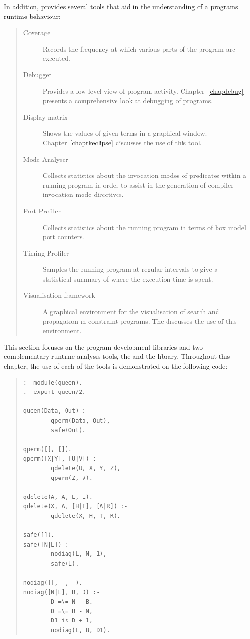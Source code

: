 In addition, \eclipse{} provides several tools that aid in the
understanding of a programs runtime behaviour:

\begin{quote}
\begin{description}
\item[Coverage] Records the frequency at which various parts of the
program are executed.
\item[Debugger] Provides a low level view of program
activity. Chapter~\ref{chapdebug} presents a comprehensive
look at debugging of \eclipse{} programs.
\item[Display matrix] Shows the values of given terms in a graphical
window. Chapter~\ref{chaptkeclipse} discusses the use of this tool.
\item[Mode Analyser] Collects statistics about the invocation modes of
predicates within a running program in order to assist in the generation of
compiler invocation mode directives.
\item[Port Profiler] Collects statistics about the running program in terms
of box model port counters.
\item[Timing Profiler] Samples the running program at regular intervals to
give a statistical summary of where the execution time is spent.
\item[Visualisation framework] A graphical environment for the
visualisation of search and propagation in constraint programs.
The  discusses the use of this
environment.
\end{description}
\end{quote}

This section focuses on the program development libraries and two
complementary runtime analysis tools, the  and the
 library.
Throughout this chapter, the use of each of the tools is demonstrated
on the following  code:
\begin{quote}
\begin{verbatim}
:- module(queen).
:- export queen/2.

queen(Data, Out) :-
        qperm(Data, Out),
        safe(Out).

qperm([], []).
qperm([X|Y], [U|V]) :-
        qdelete(U, X, Y, Z),
        qperm(Z, V).

qdelete(A, A, L, L).
qdelete(X, A, [H|T], [A|R]) :-
        qdelete(X, H, T, R).

safe([]).
safe([N|L]) :-
        nodiag(L, N, 1),
        safe(L).

nodiag([], _, _).
nodiag([N|L], B, D) :-
        D =\= N - B,
        D =\= B - N,
        D1 is D + 1,
        nodiag(L, B, D1).
\end{verbatim}
\end{quote}

